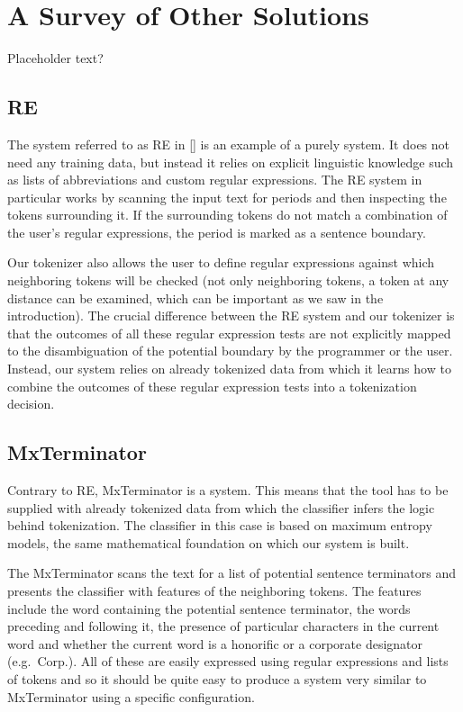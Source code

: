 \chapter{A Survey of Other Solutions}
\label{chap:survey}

Placeholder text?

\section{RE}
\label{sec:survey-re}

The system referred to as RE in [] is an example of a purely
 system. It does not need any training data, but instead it
relies on explicit linguistic knowledge such as lists of abbreviations and
custom regular expressions. The RE system in particular works by scanning the
input text for periods and then inspecting the tokens surrounding it. If the
surrounding tokens do not match a combination of the user's regular
expressions, the period is marked as a sentence boundary.

Our tokenizer also allows the user to define regular expressions against which
neighboring tokens will be checked (not only neighboring tokens, a token at any
distance can be examined, which can be important as we saw in the
introduction). The crucial difference between the RE system and our tokenizer
is that the outcomes of all these regular expression tests are not explicitly
mapped to the disambiguation of the potential boundary by the programmer or the
user. Instead, our system relies on already tokenized data from which it learns
how to combine the outcomes of these regular expression tests into a
tokenization decision.

\section{MxTerminator}
\label{sec:survey-mxterm}

Contrary to RE, MxTerminator is a  system.
This means that the tool has to be supplied with already tokenized data from
which the classifier infers the logic behind tokenization. The classifier in
this case is based on maximum entropy models, the same mathematical foundation
on which our system is built.

The MxTerminator scans the text for a list of potential sentence terminators
and presents the classifier with features of the neighboring tokens. The
features include the word containing the potential sentence terminator, the
words preceding and following it, the presence of particular characters in the
current word and whether the current word is a honorific or a corporate
designator (e.g.\ Corp.). All of these are easily expressed using regular
expressions and lists of tokens and so it should be quite easy to produce a
system very similar to MxTerminator using a specific configuration.

